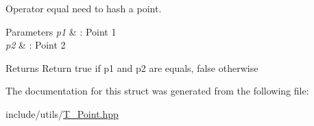 Operator equal need to hash a point. 


\begin{DoxyParams}{Parameters}
{\em p1} & \+: Point 1 \\
\hline
{\em p2} & \+: Point 2 \\
\hline
\end{DoxyParams}
\begin{DoxyReturn}{Returns}
Return true if p1 and p2 are equals, false otherwise 
\end{DoxyReturn}


The documentation for this struct was generated from the following file\+:\begin{DoxyCompactItemize}
\item 
include/utils/\hyperlink{T__Point_8hpp}{T\+\_\+\+Point.\+hpp}\end{DoxyCompactItemize}
